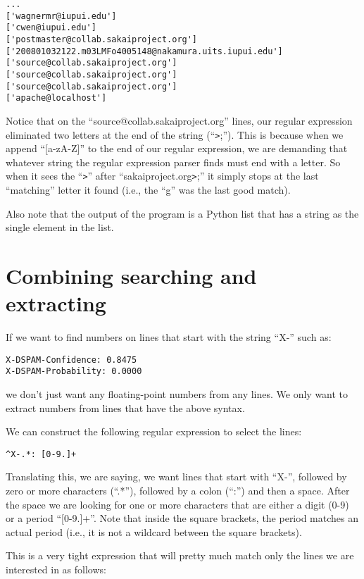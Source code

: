 \beforeverb
\begin{verbatim}
...
['wagnermr@iupui.edu']
['cwen@iupui.edu']
['postmaster@collab.sakaiproject.org']
['200801032122.m03LMFo4005148@nakamura.uits.iupui.edu']
['source@collab.sakaiproject.org']
['source@collab.sakaiproject.org']
['source@collab.sakaiproject.org']
['apache@localhost']
\end{verbatim}
\afterverb
%
Notice that on the ``source@collab.sakaiproject.org'' lines, our regular expression
eliminated two letters at the end of the string (``\verb">";'').  This is because when we
append ``[a-zA-Z]'' to the end of our regular expression, we are demanding that whatever
string the regular expression parser finds must end with a letter.   So when it sees the
``\verb">"'' after ``sakaiproject.org\verb">";'' it simply stops at the last ``matching''
letter it found (i.e., the ``g'' was the last good match).

Also note that the output of the program is a Python list that has a string as the single
element in the list.

\section{Combining searching and extracting}

If we want to find numbers on lines that start with the string ``X-'' such as:

\beforeverb
\begin{verbatim}
X-DSPAM-Confidence: 0.8475
X-DSPAM-Probability: 0.0000  
\end{verbatim}
\afterverb
%
we don't just want any floating-point numbers from any lines.  We only want to extract
numbers from lines that have the above syntax.

We can construct the following regular expression to select the lines:

\beforeverb
\begin{verbatim}
^X-.*: [0-9.]+
\end{verbatim}
\afterverb
%
Translating this, we are saying, we want lines that start with ``X-'', followed by zero or
more characters (``.*''), followed by a colon (``:'') and then a space.  After the space we are
looking for one or more characters that are either a digit (0-9) or a period ``[0-9.]+''.
Note that inside the square brackets, the period matches an actual period (i.e., it is not a
wildcard between the square brackets).

This is a very tight expression that will pretty much match only the lines we are interested
in as follows:

